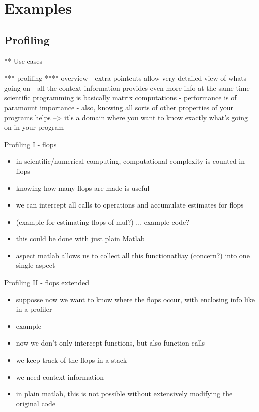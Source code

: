 \section{Examples}
\subsection{Profiling}
** Use cases

*** profiling
**** overview
     - extra pointcuts allow very detailed view of whats going on
     - all the context information provides even more info
       at the same time
     - scientific programming is basically matrix computations
     - performance is of paramount importance
     - also, knowing all sorts of other properties of your programs helps
       --> it's a domain where you want to know exactly what's going on in your program
\begin{frame}{Profiling I - flops}
  \begin{itemize}
  \item in scientific/numerical computing, computational complexity is
  counted in flops
  \item knowing how many flops are made is useful
  \item we can intercept all calls to operations and accumulate
  estimates for flops
  \item (example for estimating flops of mul?) ... example code?
  \item this could be done with just plain Matlab
  \item aspect matlab allows us to collect all this functionatliay
  (concern?) into one single aspect
  \end{itemize}
\end{frame}

\begin{frame}{Profiling II - flops extended}
  \begin{itemize}
  \item supposse now we want to know where the flops occur, with
  enclosing info like in a profiler
  \item example
  \item now we don't only intercept functions, but also function calls
  \item we keep track of the flops in a stack
  \item we need context information
  \item in plain matlab, this is not possible without extensively
  modifying the original code
  \end{itemize}
\end{frame}

